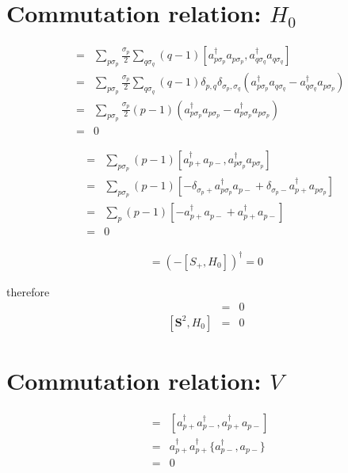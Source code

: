 \documentclass{article}
\begin{document}
\section{Commutation relation: $H_0$}
\begin{eqnarray*}
[S_z,H_0] &=& \sum_{p \sigma_p}\frac{\sigma_p}{2} \sum_{q\sigma_q} (q-1) [a_{p \sigma_p}^{\dagger} a_{p \sigma_p},a_{q \sigma_q}^{\dagger} a_{q \sigma_q}] \\
&=& \sum_{p \sigma_p}\frac{\sigma_p}{2} \sum_{q\sigma_q} (q-1) \delta_{p,q}\delta_{\sigma_p,\sigma_q} \left(  a_{p \sigma_p}^{\dagger} a_{q \sigma_q} - a_{q \sigma_q}^{\dagger}a_{p \sigma_p}  \right) \\
&=& \sum_{p \sigma_p}\frac{\sigma_p}{2} (p-1) \left(  a_{p \sigma_p}^{\dagger} a_{p \sigma_p} - a_{p \sigma_p}^{\dagger}a_{p \sigma_p}  \right) \\
&=& 0
\end{eqnarray*}

\begin{eqnarray*}
[S_+,H_0] &=& \sum_{p \sigma_p} (p-1) [ a_{p+}^{\dagger} a_{p-} , a_{p \sigma_p}^{\dagger} a_{p \sigma_p} ] \\
&=& \sum_{p \sigma_p} (p-1) [ - \delta_{\sigma_p +} a_{p\sigma_p}^{\dagger} a_{p-} + \delta_{\sigma_p -} a_{p +}^{\dagger} a_{p \sigma_p} ] \\
&=& \sum_{p} (p-1) [-  a_{p +}^{\dagger} a_{p-} +  a_{p +}^{\dagger} a_{p -}] \\
&=& 0
\end{eqnarray*}

\begin{eqnarray*}
[S_-,H_0] = \left( - [S_+,H_0] \right)^{\dagger} = 0
\end{eqnarray*}

therefore
\begin{eqnarray*}
[S_z,H_0] &=& 0 \\
\left[ \bm{S}^2,H_0 \right] &=& 0
\end{eqnarray*}

\section{Commutation relation: $V$}
\begin{eqnarray*}
[P_p^{+},S_+] &=& [a_{p+}^{\dagger}a_{p-}^{\dagger} , a_{p+}^{\dagger} a_{p-} ] \\
&=& a_{p+}^{\dagger} a_{p+}^{\dagger} \bigl\{ a_{p-}^{\dagger} , a_{p-}  \bigr\} \\
&=& 0
\end{eqnarray*}
\end{document}
